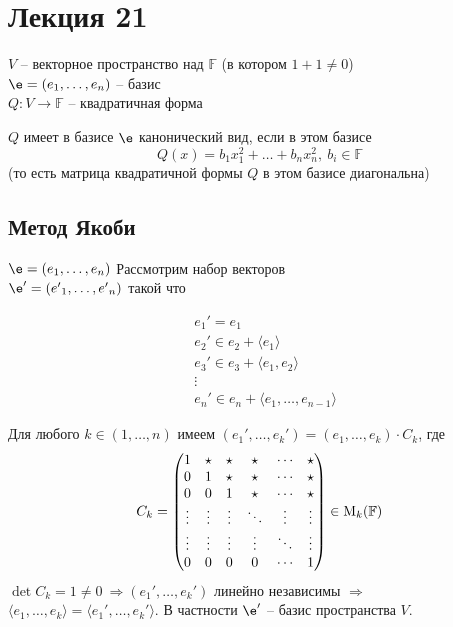 \section*{Лекция 21}
%
$V$ -- векторное пространство над $\mathbb{F}$ (в котором $1 + 1 \ne 0$) \\
$\e = \vector{e}$ -- базис \\
$Q: V \rightarrow \mathbb{F}$ -- квадратичная форма
\begin{Def}
  $Q$ имеет в базисе $\e$ канонический вид, если в этом базисе
  \[
    Q(x) = b_1x_1^2 + \ldots + b_nx_n^2,\ b_i \in \mathbb{F}
  \]
  (то есть матрица квадратичной формы $Q$ в этом базисе диагональна)  
\end{Def}
\subsection*{Метод Якоби}
%
$\e = \vector{e}$
Рассмотрим набор векторов\\
$\e' = \vector{e'}$ такой что

\[
\tag{$\star$}
\begin{aligned}
  & e_1' = e_1 \\
  & e_2' \in e_2 + \langle  e_{1} \rangle \\
  & e_3' \in e_3 + \langle  e_{1}, e_2 \rangle \\
  & \vdots \\
  & e_n' \in e_{n} + \langle  e_{1}, \ldots, e_{n - 1} \rangle
\end{aligned}
\label{eqn}
\]

Для любого $k \in (1, \ldots, n)$ имеем $(e_1', \ldots, e_k') = (e_1, \ldots, e_k) \cdot  C_k$, где
\[
C_k = \begin{pmatrix}
  1 & \star & \star & \star & \cdots & \star\\
  0 & 1 & \star & \star & \cdots & \star\\
  0 & 0 & 1 & \star & \cdots & \star \\
  \vdots & \vdots & \vdots & \ddots & \vdots & \vdots \\
  \vdots & \vdots & \vdots & \vdots & \ddots & \vdots \\
  0 & 0 & 0 & 0 & \cdots & 1
\end{pmatrix}
\in \mathrm{M}_k(\mathbb{F})\\
\]
$\det C_k = 1 \ne 0\ \Rightarrow (e_1', \ldots, e_k')$ линейно независимы $\Rightarrow$
$\langle e_1, \ldots, e_k \rangle = \langle e_1', \ldots, e_k' \rangle$. В частности
$\e'$ -- базис пространства $V$.

